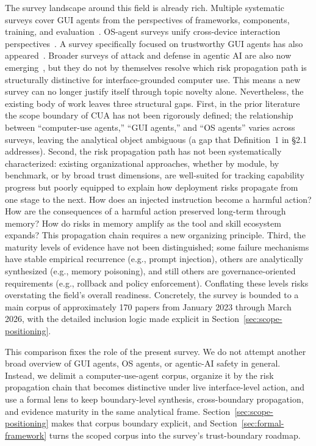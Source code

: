 The survey landscape around this field is already rich. Multiple systematic surveys cover GUI agents from the perspectives of frameworks, components, training, and evaluation~\cite{foundationguisurvey2024,nguyen2025gui}. OS-agent surveys unify cross-device interaction perspectives~\cite{hu2025osagents}. A survey specifically focused on trustworthy GUI agents has also appeared~\cite{trustworthyguisurvey2025}. Broader surveys of attack and defense in agentic AI are also now emerging~\cite{attackdefenselandscape2026}, but they do not by themselves resolve which risk propagation path is structurally distinctive for interface-grounded computer use. This means a new survey can no longer justify itself through topic novelty alone. Nevertheless, the existing body of work leaves three structural gaps. First, in the prior literature the scope boundary of CUA has not been rigorously defined; the relationship between ``computer-use agents,'' ``GUI agents,'' and ``OS agents'' varies across surveys, leaving the analytical object ambiguous (a gap that Definition~1 in \S2.1 addresses). Second, the risk propagation path has not been systematically characterized: existing organizational approaches, whether by module, by benchmark, or by broad trust dimensions, are well-suited for tracking capability progress but poorly equipped to explain how deployment risks propagate from one stage to the next. How does an injected instruction become a harmful action? How are the consequences of a harmful action preserved long-term through memory? How do risks in memory amplify as the tool and skill ecosystem expands? This propagation chain requires a new organizing principle. Third, the maturity levels of evidence have not been distinguished; some failure mechanisms have stable empirical recurrence (e.g., prompt injection), others are analytically synthesized (e.g., memory poisoning), and still others are governance-oriented requirements (e.g., rollback and policy enforcement). Conflating these levels risks overstating the field's overall readiness. Concretely, the survey is bounded to a main corpus of approximately 170 papers from January 2023 through March 2026, with the detailed inclusion logic made explicit in Section~\ref{sec:scope-positioning}.

This comparison fixes the role of the present survey. We do not attempt another broad overview of GUI agents, OS agents, or agentic-AI safety in general. Instead, we delimit a computer-use-agent corpus, organize it by the risk propagation chain that becomes distinctive under live interface-level action, and use a formal lens to keep boundary-level synthesis, cross-boundary propagation, and evidence maturity in the same analytical frame. Section~\ref{sec:scope-positioning} makes that corpus boundary explicit, and Section~\ref{sec:formal-framework} turns the scoped corpus into the survey's trust-boundary roadmap.

